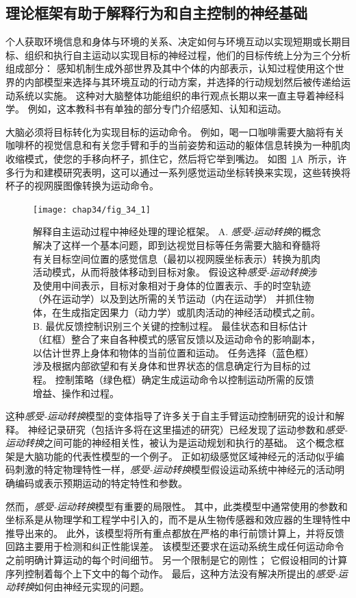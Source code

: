 \subsection{理论框架有助于解释行为和自主控制的神经基础}

个人获取环境信息和身体与环境的关系、决定如何与环境互动以实现短期或长期目标、组织和执行自主运动以实现目标的神经过程，他们的目标传统上分为三个分析组成部分：
感知机制生成外部世界及其中个体的内部表示，认知过程使用这个世界的内部模型来选择与其环境互动的行动方案，并选择的行动规划然后被传递给运动系统以实施。
这种对大脑整体功能组织的串行观点长期以来一直主导着神经科学。
例如，这本教科书有单独的部分专门介绍感知、认知和运动。


大脑必须将目标转化为实现目标的运动命令。
例如，喝一口咖啡需要大脑将有关咖啡杯的视觉信息和有关您手臂和手的当前姿势和运动的躯体信息转换为一种肌肉收缩模式，使您的手移向杯子，抓住它，然后将它举到嘴边。
如图~\ref{fig:34_1}A~所示，许多行为和建模研究表明，这可以通过一系列感觉运动坐标转换来实现，这些转换将杯子的视网膜图像转换为运动命令。


\begin{figure}[htbp]
	\centering
	\texttt{[image: chap34/fig\_34\_1]}
	\caption{解释自主运动过程中神经处理的理论框架。
		A. \textit{感受-运动转换}的概念解决了这样一个基本问题，即到达视觉目标等任务需要大脑和脊髓将有关目标空间位置的感觉信息（最初以视网膜坐标表示）转换为肌肉活动模式，从而将肢体移动到目标对象。 
		假设这种\textit{感受-运动转换}涉及使用中间表示，目标对象相对于身体的位置表示、手的时空轨迹（外在运动学）以及到达所需的关节运动（内在运动学） 并抓住物体，在生成指定因果力（动力学）或肌肉活动的神经活动模式之前。 
		B. 最优反馈控制识别三个关键的控制过程。 
		最佳状态和目标估计（红框）整合了来自各种模式的感官反馈以及运动命令的影响副本，以估计世界上身体和物体的当前位置和运动。
		任务选择（蓝色框）涉及根据内部欲望和有关身体和世界状态的信息确定行为目标的过程。
		控制策略（绿色框）确定生成运动命令以控制运动所需的反馈增益、操作和过程。}
	\label{fig:34_1}
\end{figure}


这种\textit{感受-运动转换}模型的变体指导了许多关于自主手臂运动控制研究的设计和解释。
神经记录研究（包括许多将在这里描述的研究）已经发现了运动参数和\textit{感受-运动转换}之间可能的神经相关性，被认为是运动规划和执行的基础。
这个概念框架是大脑功能的代表性模型的一个例子。
正如初级感觉区域神经元的活动似乎编码刺激的特定物理特性一样，\textit{感受-运动转换}模型假设运动系统中神经元的活动明确编码或表示预期运动的特定特性和参数。


然而，\textit{感受-运动转换}模型有重要的局限性。
其中，此类模型中通常使用的参数和坐标系是从物理学和工程学中引入的，而不是从生物传感器和效应器的生理特性中推导出来的。
此外，该模型将所有重点都放在严格的串行前馈计算上，并将反馈回路主要用于检测和纠正性能误差。
该模型还要求在运动系统生成任何运动命令之前明确计算运动的每个时间细节。
另一个限制是它的刚性；
它假设相同的计算序列控制着每个上下文中的每个动作。
最后，这种方法没有解决所提出的\textit{感受-运动转换}如何由神经元实现的问题。


